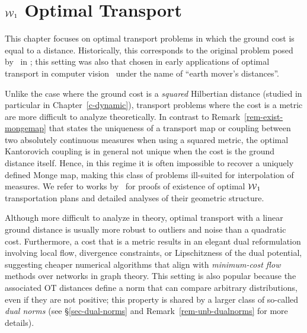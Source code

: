 

\chapter{$\operatorname{\mathcal{W}}_1$ Optimal Transport}
\label{c-w1}

This chapter focuses on optimal transport problems in which the ground cost is equal to a distance.  Historically, this corresponds to the original problem posed by~\citeauthor{Monge1781} in \citeyear{Monge1781}; this setting was also that chosen in early applications of optimal transport in computer vision~\citep{RubTomGui00} under the name of ``earth mover's distances''.

Unlike the case where the ground cost is a \emph{squared} Hilbertian distance  (studied in particular in Chapter~\ref{c-dynamic}), transport problems where the cost is a metric are more difficult to analyze theoretically.
%
In contrast to Remark~\ref{rem-exist-mongemap} that states the uniqueness of a transport map or coupling between two absolutely continuous measures when using a squared metric, the optimal Kantorovich coupling is in general not unique when the cost is the ground distance itself.  Hence, in this regime it is often impossible to recover a uniquely defined Monge map, making this class of problems ill-suited for interpolation of measures.
%
We refer to works by~\citet{trudinger2001monge,caffarelli2002constructing,sudakov1979geometric,evans1999differential} for proofs of existence of optimal $\operatorname{\mathcal{W}}_1$ transportation plans and detailed analyses of their geometric structure. 

Although more difficult to analyze in theory, optimal transport with a linear ground distance is usually more robust to outliers and noise than a quadratic cost. Furthermore, a cost that is a metric results in an elegant dual reformulation involving local flow, divergence constraints, or Lipschitzness of the dual potential, suggesting cheaper numerical algorithms that align with \emph{minimum-cost flow} methods over networks in graph theory.
%
This setting is also  popular because the associated OT distances define a norm that can compare arbitrary distributions, even if they are not positive; this property is shared by a larger class of so-called \emph{dual norms} (see \S\ref{sec-dual-norms} and Remark~\ref{rem-unb-dualnorms} for more details).


